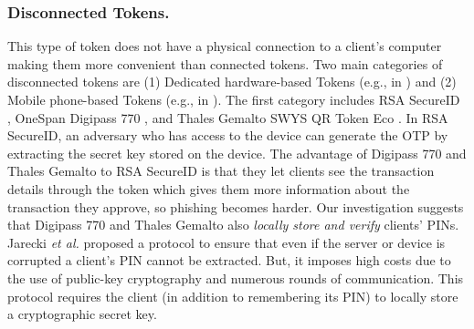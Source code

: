 \vspace{-4mm}
\subsubsection{Disconnected Tokens.}
\vspace{-2mm}
%
This type of token does not have a physical connection to a client's computer making them more convenient than connected tokens. Two main categories of disconnected tokens are (1) Dedicated hardware-based Tokens (e.g., in \cite{secureID,Digipass-website,Gemalto}) and (2) Mobile phone-based Tokens (e.g., in \cite{SARA22,KoganMB17,KonothFFARB20}). The first category includes RSA SecureID \cite{secureID}, OneSpan Digipass 770 \cite{Digipass-website}, and Thales Gemalto SWYS QR Token Eco \cite{Gemalto}. In RSA SecureID, an adversary who has access to the device can generate the OTP by extracting the secret key stored on the device.  The advantage of  Digipass 770 and Thales Gemalto to RSA SecureID is that they let clients see the transaction details through the token which gives them more information about the transaction they approve, so phishing becomes harder. 
%
Our investigation suggests that Digipass 770 and Thales Gemalto also \emph{locally store and verify} clients' PINs. Jarecki \textit{et al.} \cite{JareckiJKSS21} proposed a protocol to ensure that even if the server or device is corrupted a client's PIN cannot be extracted. But, it imposes high costs due to the use of public-key cryptography and numerous rounds of communication. This protocol requires the client (in addition to remembering its PIN) to locally store a cryptographic secret key. 







%

